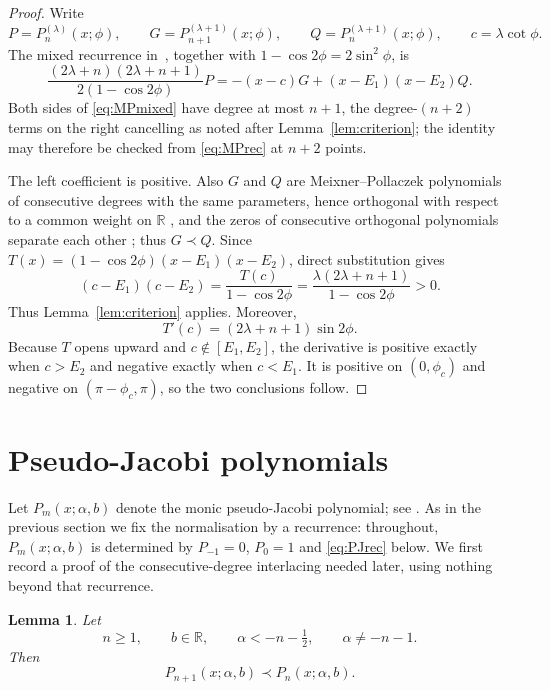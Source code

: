 \documentclass[11pt]{amsart}
\newtheorem{lemma}[theorem]{Lemma}
\theoremstyle{remark}
\newcommand{\R}{\mathbb{R}}
\begin{document}
\begin{proof}
Write
\[
 P=P_n^{(\lambda)}(x;\phi),\qquad
 G=P_{n+1}^{(\lambda+1)}(x;\phi),\qquad
 Q=P_n^{(\lambda+1)}(x;\phi),\qquad
 c=\lambda\cot\phi.
\]
The mixed recurrence in~\cite[(5.10)]{JordaanKumar}, together with
$1-\cos2\phi=2\sin^2\phi$, is
\begin{equation}\label{eq:MPmixed}
 \frac{(2\lambda+n)(2\lambda+n+1)}{2(1-\cos2\phi)}P
 =-(x-c)G+(x-E_1)(x-E_2)Q.
\end{equation}
Both sides of \eqref{eq:MPmixed} have degree at most $n+1$, the
degree-$(n+2)$ terms on the right cancelling as noted after
Lemma~\ref{lem:criterion}; the identity may therefore be checked from
\eqref{eq:MPrec} at $n+2$ points.

The left coefficient is positive.  Also $G$ and $Q$ are Meixner--Pollaczek
polynomials of consecutive degrees with the same parameters, hence orthogonal
with respect to a common weight on $\R$
\cite[\href{https://dlmf.nist.gov/18.19}{\S18.19}]{DLMF}, and the zeros of
consecutive orthogonal polynomials separate each other
\cite[\href{https://dlmf.nist.gov/18.2.vi}{\S18.2(vi)}]{DLMF}; thus
$G\prec Q$.
Since $T(x)=(1-\cos2\phi)(x-E_1)(x-E_2)$, direct substitution gives
\[
 (c-E_1)(c-E_2)
 =\frac{T(c)}{1-\cos2\phi}
 =\frac{\lambda(2\lambda+n+1)}{1-\cos2\phi}>0.
\]
Thus Lemma~\ref{lem:criterion} applies.  Moreover,
\[
 T'(c)=(2\lambda+n+1)\sin2\phi.
\]
Because $T$ opens upward and $c\notin[E_1,E_2]$, the derivative is positive
exactly when $c>E_2$ and negative exactly when $c<E_1$.  It is positive on
$(0,\phi_c)$ and negative on $(\pi-\phi_c,\pi)$, so the two conclusions follow.
\end{proof}

\section{Pseudo-Jacobi polynomials}

Let $P_m(x;\alpha,b)$ denote the monic pseudo-Jacobi polynomial; see
\cite{JordaanTookos,JordaanKumar}.  As in the previous section we fix the
normalisation by a recurrence: throughout, $P_m(x;\alpha,b)$ is determined by
$P_{-1}=0$, $P_0=1$ and \eqref{eq:PJrec} below.  We first record a proof of the
consecutive-degree interlacing needed later, using nothing beyond that
recurrence.

\begin{lemma}\label{lem:PJinterlace}
Let
\[
 n\ge1,\qquad b\in\R,\qquad
 \alpha<-n-\tfrac12,\qquad \alpha\ne-n-1.
\]
Then
\[
 P_{n+1}(x;\alpha,b)\prec P_n(x;\alpha,b).
\]
\end{lemma}
\end{document}
